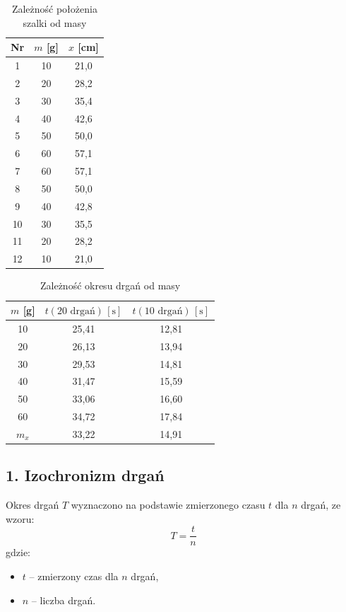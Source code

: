 \documentclass[a4paper,12pt]{article}
\begin{document}
\begin{table}[H]
    \centering
    \begin{tabular}{|c|c|c|}
        \hline
        Nr & $m$ [g] & $x$ [cm] \\
        \hline
        1  & 10  & 21,0 \\
        2  & 20  & 28,2 \\
        3  & 30  & 35,4 \\
        4  & 40  & 42,6 \\
        5  & 50  & 50,0 \\
        6  & 60  & 57,1 \\
        \hline
        7  & 60  & 57,1 \\
        8  & 50  & 50,0 \\
        9  & 40  & 42,8 \\
        10 & 30  & 35,5 \\
        11 & 20  & 28,2 \\
        12 & 10  & 21,0 \\
        \hline
    \end{tabular}
    \caption{Zależność położenia szalki od masy}
\end{table}

\begin{table}[H]
    \centering
    \begin{tabular}{|c|c|c|}
        \hline
        $m$ [g] & $t(20 \text{ drgań})\,[\text{s}]$ & $t(10 \text{ drgań})\,[\text{s}]$ \\
        \hline
        10 & 25,41 & 12,81 \\
        20 & 26,13 & 13,94 \\
        30 & 29,53 & 14,81 \\
        40 & 31,47 & 15,59 \\
        50 & 33,06 & 16,60 \\
        60 & 34,72 & 17,84 \\
        $m_x$ & 33,22 & 14,91 \\
        \hline
    \end{tabular}
    \caption{Zależność okresu drgań od masy}
\end{table}

\subsection{1. Izochronizm drgań}

Okres drgań $T$ wyznaczono na podstawie zmierzonego czasu $t$ dla $n$ drgań, ze wzoru:
\[
    T = \frac{t}{n}
\]
gdzie:
\begin{itemize}
    \item $t$ -- zmierzony czas dla $n$ drgań,
    \item $n$ -- liczba drgań.
\end{itemize}
\end{document}
